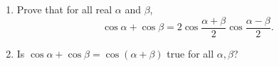 \begin{enumerate}
\item[(a)] Prove that for all real $\alpha$ and $\beta$,
\[
\cos\alpha+\cos\beta=2\cos\dfrac{\alpha+\beta}{2}\cos\dfrac{\alpha-\beta}{2}.
\]
\item[(b)] Is $\cos\alpha+\cos\beta=\cos(\alpha+\beta)$ true for all $\alpha,\beta$?
\end{enumerate}
